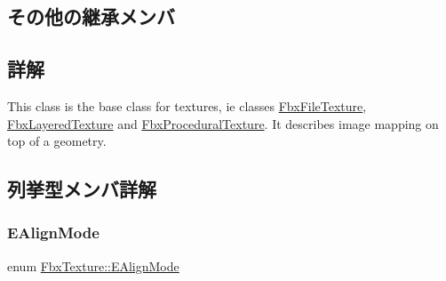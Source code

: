\subsection*{その他の継承メンバ}


\subsection{詳解}
This class is the base class for textures, ie classes \hyperlink{class_fbx_file_texture}{Fbx\+File\+Texture}, \hyperlink{class_fbx_layered_texture}{Fbx\+Layered\+Texture} and \hyperlink{class_fbx_procedural_texture}{Fbx\+Procedural\+Texture}. It describes image mapping on top of a geometry. 

\subsection{列挙型メンバ詳解}
\mbox{\label{class_fbx_texture_ab2c33e435866abe53920d298cbf681bb}} 
\subsubsection{\texorpdfstring{E\+Align\+Mode}{EAlignMode}}
{\footnotesize\ttfamily enum \hyperlink{class_fbx_texture_ab2c33e435866abe53920d298cbf681bb}{Fbx\+Texture\+::\+E\+Align\+Mode}}


